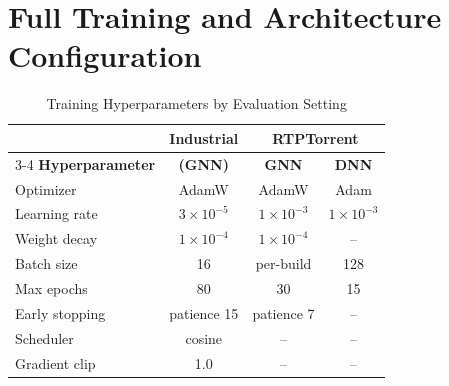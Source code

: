 \documentclass[10pt,journal,compsoc]{IEEEtran}
\begin{document}
\clearpage

\section{Full Training and Architecture Configuration}

\begin{table}[!t]
\centering
\caption{Training Hyperparameters by Evaluation Setting}
\label{tab:hyperparams}
\footnotesize
\begin{tabular}{lccc}
\toprule
 & \textbf{Industrial} & \multicolumn{2}{c}{\textbf{RTPTorrent}} \\
\cmidrule(lr){3-4}
\textbf{Hyperparameter} & \textbf{(GNN)} & \textbf{GNN} & \textbf{DNN} \\
\midrule
Optimizer & AdamW & AdamW & Adam \\
Learning rate & $3 \times 10^{-5}$ & $1 \times 10^{-3}$ & $1 \times 10^{-3}$ \\
Weight decay & $1 \times 10^{-4}$ & $1 \times 10^{-4}$ & -- \\
Batch size & 16 & per-build & 128 \\
Max epochs & 80 & 30 & 15 \\
Early stopping & patience 15 & patience 7 & -- \\
Scheduler & cosine & -- & -- \\
Gradient clip & 1.0 & -- & -- \\
\bottomrule
\end{tabular}
\end{table}
\end{document}
